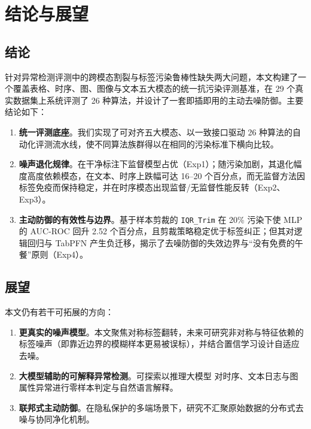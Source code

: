 \chapter{结论与展望}\label{chap:conclusion}

\section{结论}

针对异常检测评测中的跨模态割裂与标签污染鲁棒性缺失两大问题，本文构建了一个覆盖表格、时序、图、图像与文本五大模态的统一抗污染评测基准，在 29 个真实数据集上系统评测了 26 种算法，并设计了一套即插即用的主动去噪防御。主要结论如下：

\begin{enumerate}
    \item \textbf{统一评测底座}。我们实现了可对齐五大模态、以一致接口驱动 26 种算法的自动化评测流水线，使不同算法族群得以在相同的污染标准下横向比较。
    \item \textbf{噪声退化规律}。在干净标注下监督模型占优（Exp1）；随污染加剧，其退化幅度高度依赖模态，在文本、时序上跌幅可达 16--20 个百分点，而无监督方法因标签免疫而保持稳定，并在时序模态出现监督/无监督性能反转（Exp2、Exp3）。
    \item \textbf{主动防御的有效性与边界}。基于样本剪裁的 \texttt{IQR\_Trim} 在 20\% 污染下使 MLP 的 AUC-ROC 回升 2.52 个百分点，且剪裁策略稳定优于标签纠正；但其对逻辑回归与 TabPFN 产生负迁移，揭示了去噪防御的失效边界与“没有免费的午餐”原则（Exp4）。
\end{enumerate}

\section{展望}

本文仍有若干可拓展的方向：
\begin{enumerate}
    \item \textbf{更真实的噪声模型}。本文聚焦对称标签翻转，未来可研究非对称与特征依赖的标签噪声（即靠近边界的模糊样本更易被误标），并结合置信学习设计自适应去噪。
    \item \textbf{大模型辅助的可解释异常检测}。可探索以推理大模型 \cite{guo_deepseek-r1_2025} 对时序、文本日志与图属性异常进行零样本判定与自然语言解释。
    \item \textbf{联邦式主动防御}。在隐私保护的多端场景下，研究不汇聚原始数据的分布式去噪与协同净化机制。
\end{enumerate}
